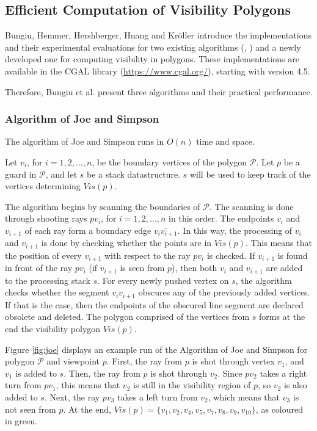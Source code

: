 \subsection{Efficient Computation of Visibility Polygons \cite{DBLP:journals/corr/BungiuHHHK14}}
Bungiu, Hemmer, Hershberger, Huang and Kr\"oller  \cite{DBLP:journals/corr/BungiuHHHK14} introduce the implementations and their experimental evaluations for two existing algorithms (\cite{joe1987corrections}, \cite{asano1985efficient}) and a newly developed one for computing visibility in polygons. These implementations are available in the CGAL library (\url{https://www.cgal.org/}), starting with version 4.5.


Therefore, Bungiu et al. present three algorithms and their practical performance.

\subsubsection{Algorithm of Joe and Simpson \cite{joe1987corrections}}
The algorithm of Joe and Simpson \cite{joe1987corrections} runs in $O(n)$ time and space. 

Let $v_i$, for $i = {1, 2, ..., n}$, be the boundary vertices of the polygon $\mathcal P$. Let $p$ be a guard in $\mathcal P$, and let $s$ be a stack datastructure. $s$ will be used to keep track of the vertices determining $Vis(p)$. 

The algorithm begins by scanning the boundaries of $\mathcal P$. The scanning is done through shooting rays $pv_i$, for $i = {1, 2, ..., n}$ in this order. The endpoints $v_i$ and $v_{i + 1}$ of each ray form a boundary edge $\overline{v_iv_{i + 1}}$. In this way, the processing of $v_i$ and $v_{i + 1}$ is done by checking whether the points are in $Vis(p)$. This means that the position of every $v_{i + 1}$ with respect to the ray $pv_i$ is checked. If $v_{i + 1}$ is found in front of the ray $pv_i$ (if $v_{i + 1}$ is seen from $p$), then both $v_i$ and $v_{i + 1}$ are added to the processing stack $s$. For every newly pushed vertex on $s$, the algorithm checks whether the segment $v_iv_{i + 1}$ obscures any of the previously added vertices. If that is the case, then the endpoints of the obscured line segment are declared obsolete and deleted. The polygon comprised of the vertices from $s$ forms at the end the visibility polygon $Vis(p)$.

Figure \ref{fig:joe} displays an example run of the Algorithm of Joe and Simpson \cite{joe1987corrections} for polygon $\mathcal P$ and viewpoint $p$. First, the ray from $p$ is shot through vertex $v_1$, and $v_1$ is added to $s$. Then, the ray from $p$ is shot through $v_2$. Since $pv_2$ takes a right turn from $pv_1$, this means that $v_2$ is still in the visibility region of $p$, so $v_2$ is also added to $s$. Next, the ray $pv_3$ takes a left turn from $v_2$, which means that $v_3$ is not seen from $p$. At the end, $Vis(p) = \{v_1, v_2, v_4, v_5, v_7, v_8, v_9, v_{10}\}$, as coloured in green. 

